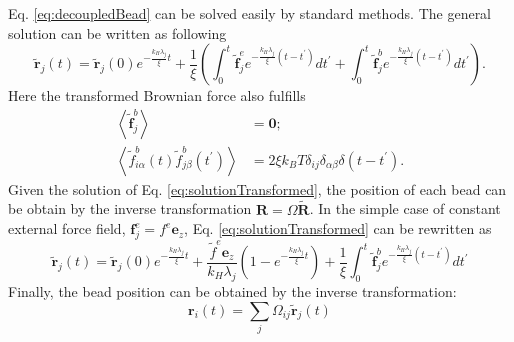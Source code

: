 Eq. \eqref{eq:decoupledBead} can be solved easily by standard methods. The general solution can be written as following
\begin{equation}
    \label{eq:solutionTransformed}
    \tilde{\mathbf{r}}_j(t) = \tilde{\mathbf{r}}_j(0) e^{-\frac{k_H \lambda_j}{\xi} t} + \frac{1}{\xi}
    \left(\int^t_0{\tilde{\mathbf{f}}^e_j e^{-\frac{k_H \lambda_j}{\xi} (t -t^\prime)}} dt^{\prime} + \int^t_0{\tilde{\mathbf{f}}^b_j e^{-\frac{k_H \lambda_j}{\xi} (t -t^\prime)} }dt^{\prime} \right).
\end{equation}
Here the transformed Brownian force also fulfills 
\begin{subequations}
    \begin{align}
    \label{eq:brownianTransformed}
    \left<\tilde{\mathbf{f}}_j^b\right> & = \mathbf 0; \\
    \left<\tilde{f}_{i\alpha}^b(t)\tilde{f}_{j\beta}^b(t^\prime)\right> & = 2\xi k_B T \delta_{ij} \delta_{\alpha\beta}\delta(t-t^\prime).
    \end{align}
\end{subequations}
Given the solution of Eq. \eqref{eq:solutionTransformed}, the position of each bead can be obtain by the inverse transformation $\mathbf{R} = \Omega\tilde{\mathbf{R}}$. In the simple case of constant external force field, $\mathbf{f}_j^e = f^e \mathbf{e}_z$, Eq. \eqref{eq:solutionTransformed} can be rewritten as
\begin{equation}
    \label{eq:solutionTransformedConstant}
    \tilde{\mathbf{r}}_j(t) = \tilde{\mathbf{r}}_j(0) e^{-\frac{k_H \lambda_j}{\xi} t} + \frac{\tilde{f}^e\mathbf{e}_z}{k_H \lambda_j}\left(1-e^{-\frac{k_H \lambda_j}{\xi} t} \right) +\frac{1}{\xi} \int^t_0{\tilde{\mathbf{f}}^b_j e^{-\frac{k_H \lambda_j}{\xi} (t -t^\prime)} }dt^{\prime}
\end{equation}
Finally, the bead position can be obtained by the inverse transformation:
\begin{equation}
    \label{eq:beadPosRouse}
    \mathbf{r}_i (t) = \sum_j \Omega_{ij} \tilde{\mathbf{r}}_j(t)
\end{equation}

